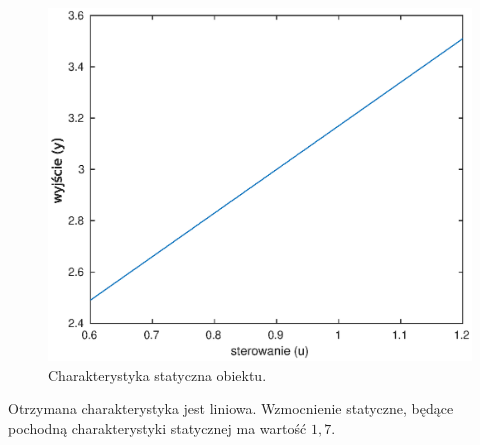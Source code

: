 \begin{figure}
  \includegraphics{wykresy/char_stat.eps}
  \caption{Charakterystyka statyczna obiektu.}
  \label{fig:char_stat}
\end{figure}
Otrzymana charakterystyka jest liniowa. Wzmocnienie statyczne, będące pochodną
charakterystyki statycznej ma wartość $1,7$.
